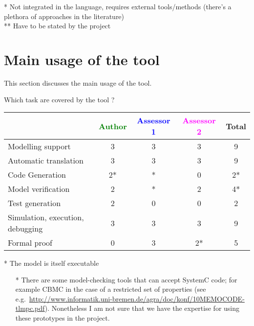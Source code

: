 \begin{author_comment}
 * Not integrated in the language, requires external tools/methods (there's a plethora of approaches in the literature)\\
 ** Have to be stated by the project
\end{author_comment}

\section{Main usage of the tool}
\label{main_usage}

This section discusses the main usage of the tool.

Which task are covered by the tool ?


\begin{tabular}{|l | c | c | c | c|}
\hline
& \textcolor{green}{Author} & \textcolor{blue}{Assessor 1} & \textcolor{magenta}{Assessor 2} & Total \\
\hline
Modelling support &3 &3 &3 & 9 \\
\hline
Automatic translation &3 &3 &3 & 9 \\
\hline
Code Generation &2* & * &0 & 2* \\
\hline
Model verification &2 & * &2 & 4* \\
\hline
Test generation &2 &0 &0 & 2 \\
\hline
Simulation, execution, debugging &3 &3 &3 & 9 \\
\hline
Formal proof &0 &3 &2* &  5\\
\hline
\end{tabular}

\begin{author_comment}
 * The model is itself executable
\end{author_comment}



\begin{assessor2}
  \begin{itemize}
  \item[*] There are some model-checking tools that can accept SystemC
    code; for example CBMC in the case of a restricted set of
    properties (see
    e.g.~\url{http://www.informatik.uni-bremen.de/agra/doc/konf/10MEMOCODE-tlmpc.pdf}). Nonetheless
    I am not sure that we have the expertise for using these
    prototypes in the project.
  \end{itemize}  
\end{assessor2}




